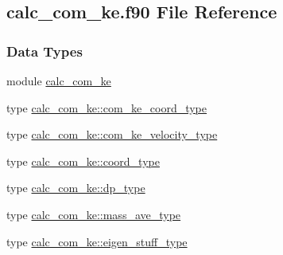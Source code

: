 \hypertarget{calc__com__ke_8f90}{\subsection{calc\-\_\-com\-\_\-ke.\-f90 File Reference}
\label{calc__com__ke_8f90}
}
\subsubsection*{Data Types}
\begin{DoxyCompactItemize}
\item 
module \hyperlink{classcalc__com__ke}{calc\-\_\-com\-\_\-ke}
\item 
type \hyperlink{structcalc__com__ke_1_1com__ke__coord__type}{calc\-\_\-com\-\_\-ke\-::com\-\_\-ke\-\_\-coord\-\_\-type}
\item 
type \hyperlink{structcalc__com__ke_1_1com__ke__velocity__type}{calc\-\_\-com\-\_\-ke\-::com\-\_\-ke\-\_\-velocity\-\_\-type}
\item 
type \hyperlink{structcalc__com__ke_1_1coord__type}{calc\-\_\-com\-\_\-ke\-::coord\-\_\-type}
\item 
type \hyperlink{structcalc__com__ke_1_1dp__type}{calc\-\_\-com\-\_\-ke\-::dp\-\_\-type}
\item 
type \hyperlink{structcalc__com__ke_1_1mass__ave__type}{calc\-\_\-com\-\_\-ke\-::mass\-\_\-ave\-\_\-type}
\item 
type \hyperlink{structcalc__com__ke_1_1eigen__stuff__type}{calc\-\_\-com\-\_\-ke\-::eigen\-\_\-stuff\-\_\-type}
\end{DoxyCompactItemize}

